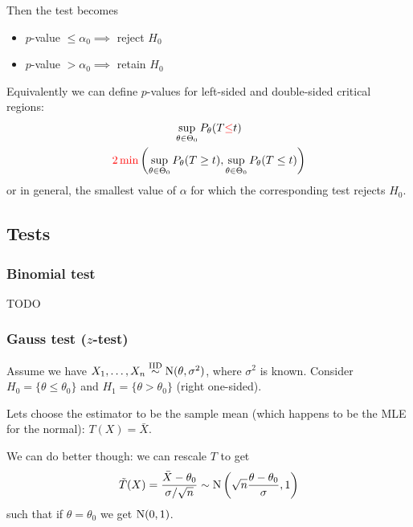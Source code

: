 \documentclass[12pt]{extarticle}
\newcommand{\Normal}{{\operatorfont N}}
\begin{document}
Then the test becomes
\begin{itemize}
    \item $p$-value $\leq \alpha_0 \implies$ reject $H_0$
    \item $p$-value $> \alpha_0 \implies$ retain $H_0$
\end{itemize}

Equivalently we can define $p$-values for left-sided and double-sided critical regions:
\begin{gather}
    \sup_{\theta \in \Theta_0} P_\theta (T {\color{red} \leq} t)\\
    {\color{red} 2 \min }\left( \sup_{\theta \in \Theta_0} P_\theta (T \geq t), \sup_{\theta \in \Theta_0} P_\theta (T \leq t) \right)
\end{gather}
or in general, the smallest value of $\alpha$ for which the corresponding test rejects $H_0$.

\subsection{Tests}

\subsubsection{Binomial test}

TODO

\subsubsection{Gauss test (\texorpdfstring{$z$}{z}-test)}

Assume we have $X_1, \dots, X_n \stackrel{\text{IID}}{\sim} \Normal(\theta, \sigma^2)$, where $\sigma^2$ is known.
Consider $H_0 = \{ \theta \leq \theta_0 \}$ and $H_1 = \{ \theta \gt \theta_0 \}$ (right one-sided).

Lets choose the estimator to be the sample mean (which happens to be the MLE for the normal): $T(X) = \bar X$.

We can do better though: we can rescale $T$ to get
\begin{equation}
    \tilde{T}(X) = \frac{\bar X - \theta_0}{\sigma /\sqrt{n}} \sim \Normal\left(\sqrt{n} \frac{\theta - \theta_0}{\sigma}, 1\right)
\end{equation}
such that if $\theta = \theta_0$ we get $\Normal(0,1)$.
\end{document}
